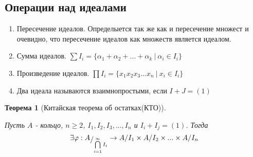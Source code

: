 \documentclass[12pt, a4paper]{article}
\newcommand{\bo}{\geqslant}
\theoremstyle{plain}
\newtheorem*{Th*}{Теорема}
\theoremstyle{definition}
\begin{document}
\subsection*{Операции над идеалами}
\begin{enumerate}
    \item Пересечение идеалов. Определыется так же как и пересечение множест и очевидно, что пересечение идеалов как множеств является идеалом.
    \item Сумма идеалов. $\sum I_i = \{\alpha_1+\alpha_2+...+\alpha_k \ | \ \alpha_i\in I_i\}$
    \item Произведение идеалов. $\prod I_i = \{x_1x_2x_3...x_n\ | \ x_i\in I_i\}$
    \item Два идеала называются взаимнопростыми, если $I+J = (1)$
\end{enumerate}
\begin{Th*}[Китайская теорема об остатках(КТО)] ~\
    
    Пусть $A$ - кольцо, $n\bo 2$, $I_1,I_2,I_3,...,I_n$  и  $I_i+I_j = (1)$. Тогда 
    \[\exists\varphi:A\raisebox{-.5ex}{$/$}_{\bigcap\limits_{i=1}^{\infty}I_i} \to A/I_1\times A/I_2\times...\times A/I_n\]
\end{Th*}
\end{document}
